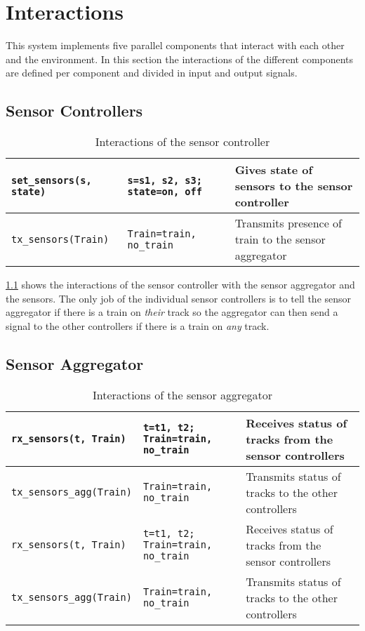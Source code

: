 \documentclass[final]{report}
\begin{document}
\chapter{Interactions}
\label{ch:interactions}
This system implements five parallel components that interact with each other and the environment.
In this section the interactions of the different components are defined per component and divided in input and output signals.

\section{Sensor Controllers}
\begin{table}[H]
\centering
    \begin{tabular}{|l|l|l|}
    \hline
    \texttt{set\_sensors(s, state)} & \texttt{s=s1, s2, s3; state=on, off}  & Gives state of sensors to the sensor controller      \\ \hline
    \texttt{tx\_sensors(Train)}     & \texttt{Train=train, no\_train}       & Transmits presence of train to the sensor aggregator \\ \hline
    \end{tabular}
    \caption{Interactions of the sensor controller}
    \label{tab:sensorSignals}
\end{table}

\cref{tab:sensorSignals} shows the interactions of the sensor controller with the sensor aggregator and the sensors.
The only job of the individual sensor controllers is to tell the sensor aggregator if there is a train on \textit{their} track so the aggregator can then send a signal to the other controllers if there is a train on \textit{any} track.

\section{Sensor Aggregator}
\begin{table}[H]
\centering
    \begin{tabular}{|l|l|l|}
    \hline
    \texttt{rx\_sensors(t, Train)}   & \texttt{t=t1, t2; Train=train, no\_train} & Receives status of tracks from the sensor controllers \\ \hline
    \texttt{tx\_sensors\_agg(Train)} & \texttt{Train=train, no\_train}           & Transmits status of tracks to the other controllers   \\
    \texttt{rx\_sensors(t, Train)}   & \texttt{t=t1, t2; Train=train, no\_train} & Receives status of tracks from the sensor controllers \\ \hline
    \texttt{tx\_sensors\_agg(Train)} & \texttt{Train=train, no\_train}           & Transmits status of tracks to the other controllers   \\ \hline
    \end{tabular}
\caption{Interactions of the sensor aggregator}
\label{tab:sensorAggSignals}
\end{table}
\end{document}
